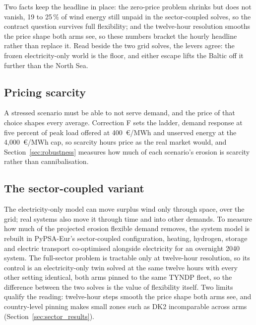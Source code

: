 Two facts keep the headline in place: the zero-price problem shrinks but does
not vanish, 19 to 25\,\% of wind energy still unpaid in the sector-coupled
solves, so the contract question survives full flexibility; and the
twelve-hour resolution smooths the price shape both arms see, so these
numbers bracket the hourly headline rather than replace it. Read beside the two grid solves, the levers agree: the frozen electricity-only world is the
floor, and either escape lifts the Baltic off it further than the North
Sea.

\FloatBarrier


\subsection{Pricing scarcity}\label{sec:scarcity_method}

A stressed scenario must be able to not serve demand, and the price of that
choice shapes every average. Correction F sets the ladder, demand response at
five percent of peak load offered at 400~\euro/MWh and unserved energy at the
4,000~\euro/MWh cap, so scarcity hours price as the real market would, and
Section~\ref{sec:robustness} measures how much of each scenario's erosion is
scarcity rather than cannibalisation.

\subsection{The sector-coupled variant}\label{sec:sector_method}

The electricity-only model can move surplus wind only through space, over the
grid; real systems also move it through time and into other demands. To measure how much of the projected erosion flexible demand removes, the
system model is rebuilt in PyPSA-Eur's sector-coupled configuration,
heating, hydrogen, storage and electric transport co-optimised alongside
electricity for an overnight 2040 system. The full-sector problem is tractable
only at twelve-hour resolution, so its control is an electricity-only twin
solved at the same twelve hours with every other setting identical, both arms
pinned to the same TYNDP fleet, so the difference between the two solves is
the value of flexibility itself. Two limits qualify the reading: twelve-hour
steps smooth the price shape both arms see, and country-level pinning makes
small zones such as DK2 incomparable across arms
(Section~\ref{sec:sector_results}).

